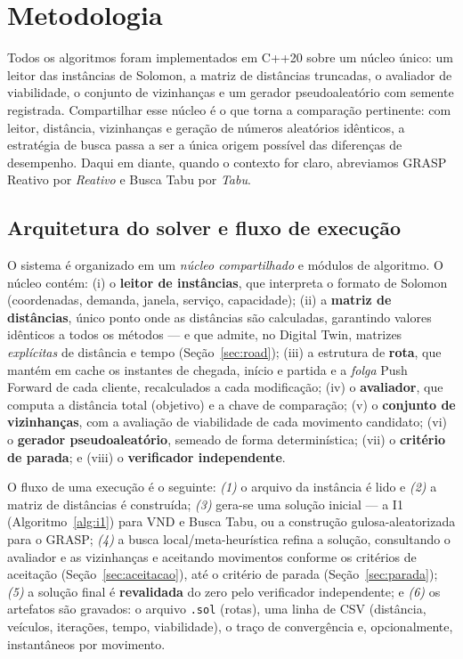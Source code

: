 \documentclass[12pt, a4paper]{article}
\begin{document}
\section{Metodologia}\label{sec:metodo}

Todos os algoritmos foram implementados em C++20 sobre um núcleo único: um leitor das instâncias de Solomon, a matriz de distâncias truncadas, o avaliador de viabilidade, o conjunto de vizinhanças e um gerador pseudoaleatório com semente registrada. Compartilhar esse núcleo é o que torna a comparação pertinente: com leitor, distância, vizinhanças e geração de números aleatórios idênticos, a estratégia de busca passa a ser a única origem possível das diferenças de desempenho. Daqui em diante, quando o contexto for claro, abreviamos GRASP Reativo por \emph{Reativo} e Busca Tabu por \emph{Tabu}.

\subsection{Arquitetura do solver e fluxo de execução}\label{sec:arquitetura}
O sistema é organizado em um \emph{núcleo compartilhado} e módulos de algoritmo. O núcleo contém: (i) o \textbf{leitor de instâncias}, que interpreta o formato de Solomon (coordenadas, demanda, janela, serviço, capacidade); (ii) a \textbf{matriz de distâncias}, único ponto onde as distâncias são calculadas, garantindo valores idênticos a todos os métodos --- e que admite, no Digital Twin, matrizes \emph{explícitas} de distância e tempo (Seção~\ref{sec:road}); (iii) a estrutura de \textbf{rota}, que mantém em cache os instantes de chegada, início e partida e a \emph{folga} Push Forward de cada cliente, recalculados a cada modificação; (iv) o \textbf{avaliador}, que computa a distância total (objetivo) e a chave de comparação; (v) o \textbf{conjunto de vizinhanças}, com a avaliação de viabilidade de cada movimento candidato; (vi) o \textbf{gerador pseudoaleatório}, semeado de forma determinística; (vii) o \textbf{critério de parada}; e (viii) o \textbf{verificador independente}.

O fluxo de uma execução é o seguinte: \emph{(1)} o arquivo da instância é lido e \emph{(2)} a matriz de distâncias é construída; \emph{(3)} gera-se uma solução inicial --- a I1 (Algoritmo~\ref{alg:i1}) para VND e Busca Tabu, ou a construção gulosa-aleatorizada para o GRASP; \emph{(4)} a busca local/meta-heurística refina a solução, consultando o avaliador e as vizinhanças e aceitando movimentos conforme os critérios de aceitação (Seção~\ref{sec:aceitacao}), até o critério de parada (Seção~\ref{sec:parada}); \emph{(5)} a solução final é \textbf{revalidada} do zero pelo verificador independente; e \emph{(6)} os artefatos são gravados: o arquivo \texttt{.sol} (rotas), uma linha de CSV (distância, veículos, iterações, tempo, viabilidade), o traço de convergência e, opcionalmente, instantâneos por movimento.
\end{document}
